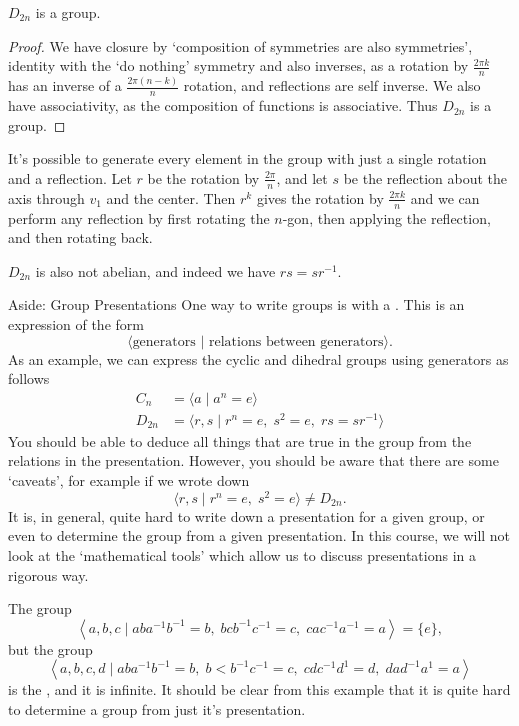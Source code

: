 \documentclass[a4]{scrreprt}
\begin{document}
\begin{proposition}
	$D_{2n}$ is a group.
\end{proposition}
\begin{proof}
	We have closure by `composition of symmetries are also symmetries', identity with the `do nothing' symmetry and also inverses, as a rotation by $\frac{2 \pi k}{n}$ has an inverse of a $\frac{2\pi(n - k)}{n}$ rotation, and reflections are self inverse. We also have associativity, as the composition of functions is associative. Thus $D_{2n}$ is a group. 
\end{proof}

It's possible to generate every element in the group with just a single rotation and a reflection. Let $r$ be the rotation by $\frac{2\pi}{n}$, and let $s$ be the reflection about the axis through $v_1$ and the center. Then $r^k$ gives the rotation by $\frac{2 \pi k}{n}$ and we can perform any reflection by first rotating the $n$-gon, then applying the reflection, and then rotating back. 

$D_{2n}$ is also not abelian, and indeed we have $rs = sr^{-1}$.

\begin{aside}{Aside: Group Presentations}
One way to write groups is with a . This is an expression of the form
$$
\langle \text{generators } \lvert \text{ relations between generators} \rangle.
$$
As an example, we can express the cyclic and dihedral groups using generators as follows
\begin{align*}
	C_n &= \langle a\mid  a^n = e \rangle \\
	D_{2n} &= \langle r, s \mid r^n = e,\; s^2 = e,\; rs = sr^{-1} \rangle
\end{align*}
You should be able to deduce all things that are true in the group from the relations in the presentation. However, you should be aware that there are some `caveats', for example if we wrote down
$$
\langle r, s \mid r^n = e, \; s^2 = e \rangle \neq D_{2n}.
$$
It is, in general, quite hard to write down a presentation for a given group, or even to determine the group from a given presentation. In this course, we will not look at the `mathematical tools' which allow us to discuss presentations in a rigorous 
way.

\begin{example}
	The group
	$$
	\left\langle a, b, c \mid a b a^{-1} b^{-1}=b, \; b c b^{-1} c^{-1}=c, \; cac^{-1} a^{-1}=a\right\rangle=\{e\},
	$$
	but the group
	$$
	\left\langle a, b, c, d \mid a b a^{-1} b^{-1}=b, \; b<b^{-1} c^{-1}=c,\; c d c^{-1} d^{1}=d, \; d a d^{-1} a^{1}=a\right\rangle
	$$
	is the , and it is infinite. It should be clear from this example that it is quite hard to determine a group from just it's presentation.
\end{example}

\end{aside}
\end{document}
